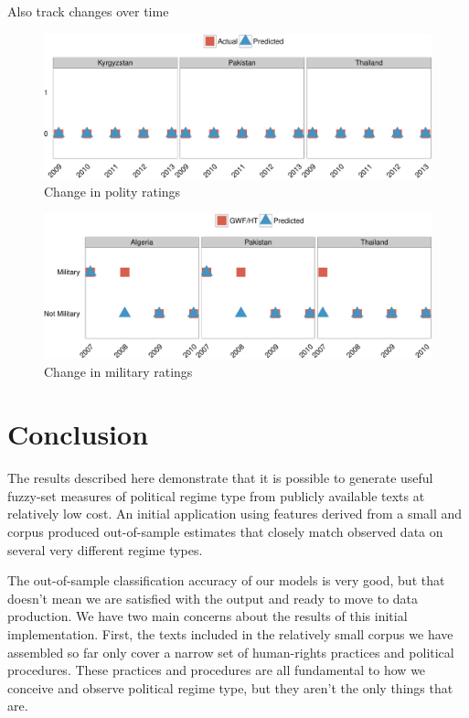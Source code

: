\documentclass[pdftex,12pt,fullpage,oneside]{amsart}
\begin{document}
Also track changes over time

\begin{figure}[ht]
	\centering
	\includegraphics[width=.6\textwidth]{polCat_perfChange}
	\caption{Change in polity ratings}
\end{figure}


\begin{figure}[ht]
	\centering
	\includegraphics[width=.6\textwidth]{military_perfChange}
	\caption{Change in military ratings}
\end{figure}

\section{Conclusion}

The results described here demonstrate that it is possible to generate useful fuzzy-set measures of political regime type from publicly available texts at relatively low cost. An initial application using features derived from a small and corpus produced out-of-sample estimates that closely match observed data on several very different regime types.

The out-of-sample classification accuracy of our models is very good, but that doesn't mean we are satisfied with the output and ready to move to data production. We have two main concerns about the results of this initial implementation. First, the texts included in the relatively small corpus we have assembled so far only cover a narrow set of human-rights practices and political procedures. These practices and procedures are all fundamental to how we conceive and observe political regime type, but they aren't the only things that are.
\end{document}
